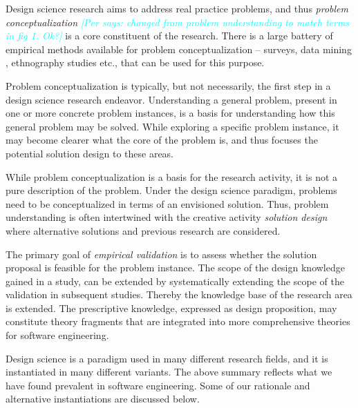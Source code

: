 \documentclass[graybox]{svmult}
\newcommand{\per}[1]{\textcolor{cyan}{{\it [Per says: #1]}}}
\newcommand{\per}[1]{}
\begin{document}
Design science research aims to address real practice problems, and thus \emph{problem conceptualization} \per{changed from problem understanding to match terms in fig 1. Ok?} is a core constituent of the research. There is a large battery of empirical methods available for problem conceptualization -- surveys, data mining \cite{MenziesDataMining2016}, ethnography studies \cite{SharpEthnography2016} etc., that can be used for this purpose. 

Problem conceptualization is typically, but not necessarily, the first step in a design science research endeavor. Understanding a general problem, present in one or more concrete problem instances, is a basis for understanding how this general problem may be solved.  While exploring a specific problem instance,  it may become clearer what the core of the problem is, and thus focuses the potential solution design to these areas. 

While problem conceptualization is a basis for the research activity, it is not a pure description of the problem. Under the design science paradigm, problems need to be conceptualized in terms of an envisioned solution. Thus, problem understanding is often intertwined with the creative activity \emph{solution design} where alternative solutions and previous research are considered. %


 The primary goal of \emph{empirical validation} is to assess whether the solution proposal is feasible for the problem instance. The scope of the design knowledge gained in a study, can be extended by systematically extending the scope of the validation in subsequent studies. Thereby the knowledge base of the research area is extended. The prescriptive knowledge, expressed as design proposition,  may constitute theory fragments that are integrated into more comprehensive theories for software engineering. 


Design science is a paradigm used in many different research fields, and it is instantiated in many different variants.  The above summary reflects what we have found prevalent in software engineering. Some of our rationale and alternative instantiations are discussed below.
\end{document}
